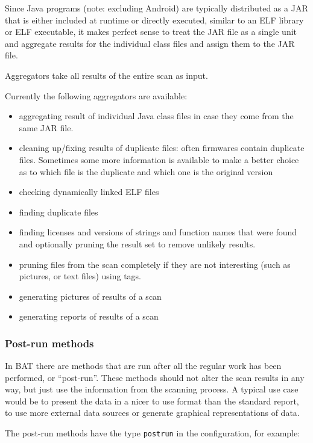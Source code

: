 \documentclass[10pt]{article}
\begin{document}
Since Java programs (note: excluding Android) are typically distributed as a
JAR that is either included at runtime or directly executed, similar to an ELF
library or ELF executable, it makes perfect sense to treat the JAR file as a
single unit and aggregate results for the individual class files and assign
them to the JAR file.

Aggregators take all results of the entire scan as input.

Currently the following aggregators are available:

\begin{itemize}
\item aggregating result of individual Java class files in case they come from
the same JAR file.
\item cleaning up/fixing results of duplicate files: often firmwares contain
duplicate files. Sometimes some more information is available to make a better
choice as to which file is the duplicate and which one is the original version
\item checking dynamically linked ELF files
\item finding duplicate files
\item finding licenses and versions of strings and function names that were
found and optionally pruning the result set to remove unlikely results.
\item pruning files from the scan completely if they are not interesting (such
as pictures, or text files) using tags.
\item generating pictures of results of a scan
\item generating reports of results of a scan
\end{itemize}

\subsubsection{Post-run methods}

In BAT there are methods that are run after all the regular work has been
performed, or ``post-run''. These methods should not alter the scan results in
any way, but just use the information from the scanning process. A typical use
case would be to present the data in a nicer to use format than the standard
report, to use more external data sources or generate graphical representations
of data.

The post-run methods have the type \texttt{postrun} in the configuration, for
example:
\end{document}
